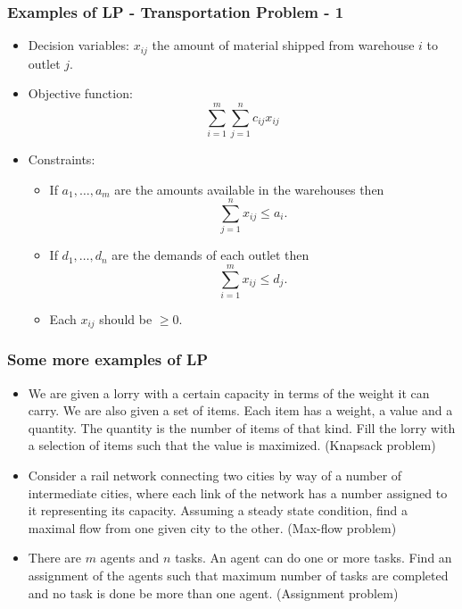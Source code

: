 \documentclass{beamer}
\begin{document}
\begin{frame}
\frametitle{Examples of LP - Transportation Problem - 1}
\begin{itemize}
\item Decision variables: $x_{ij}$ the amount of material shipped from warehouse
$i$ to outlet $j$.
\item Objective function: 
\begin{equation}\nonumber
\sum_{i=1}^m\sum_{j=1}^n c_{ij}x_{ij}
\end{equation}
\item Constraints:
\begin{itemize}
\item If $a_1, \ldots, a_m$ are the amounts available in the warehouses then
\begin{equation}\nonumber
\sum_{j=1}^n x_{ij} \le a_i.
\end{equation}
\item If $d_1, \ldots, d_n$ are the demands of each outlet then
\begin{equation}\nonumber
\sum_{i=1}^m x_{ij} \le d_j.
\end{equation}
\item Each $x_{ij}$ should be $\ge 0$.
\end{itemize}
\end{itemize}
\end{frame}

\begin{frame}
\frametitle{Some more examples of LP}
\begin{itemize}
\item We are given a lorry with a certain capacity in terms of the weight it 
can carry. We are also given a set of items. Each item has a weight, a value 
and a quantity. The quantity is the number of items of that kind. Fill the 
lorry with a selection of items such that the value is maximized. (Knapsack
problem)

\item Consider a rail network connecting two cities by way of a number of 
intermediate cities, where each link of the network has a number assigned to it 
representing its capacity. Assuming a steady state condition, find a maximal 
flow from one given city to the other. (Max-flow problem)

\item There are $m$ agents and $n$ tasks. An agent can do one or more tasks.
Find an assignment of the agents such that maximum number of tasks are completed
and no task is done be more than one agent. (Assignment problem)
 
\end{itemize}
\end{frame}
\end{document}
